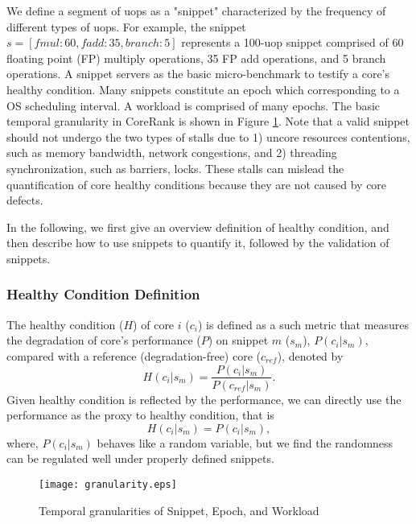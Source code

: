 We define a segment of uops as a "snippet" characterized by the frequency of different types of uops. For example, the snippet $s=[fmul:60, fadd:35, branch:5]$ represents a 100-uop snippet comprised of 60 floating point (FP) multiply operations, 35 FP add operations, and 5 branch operations. A snippet servers as the basic micro-benchmark to testify a core's healthy condition. Many snippets constitute an epoch which corresponding to a OS scheduling interval. A workload is comprised of many epochs. The basic temporal granularity in CoreRank is shown in Figure \ref{granu}. Note that a valid snippet should not undergo the two types of stalls due to 1) uncore resources contentions, such as memory bandwidth, network congestions, and 2) threading synchronization, such as barriers, locks. These stalls can mislead the quantification of core healthy conditions because they are not caused by core defects.

In the following,  we first give an overview definition of healthy condition, and then describe how to use snippets to quantify it, followed by the validation of snippets. 

\subsubsection{Healthy Condition Definition}
The healthy condition ($H$) of core $i$ ($c_i$) is defined as a such metric that measures the degradation of core's performance ($P$) on snippet $m$ ($s_m$), $P(c_i|s_m)$, compared with a reference (degradation-free) core ($c_{ref}$), denoted by
\begin{equation}
  H(c_i|s_m) = \frac{P(c_i|s_m)}{P(c_{ref}|s_m)}.\label{hdef}
\end{equation}
Given healthy condition is reflected by the performance, we can directly use the performance as the proxy to healthy condition, that is
\begin{equation}
  H({c_i|s_m}) = {P(c_i|s_m)}, \label{healthy}
\end{equation}
where, $P(c_i|s_m)$ behaves like a random variable, but we find the randomness can be regulated well under properly defined snippets.

\begin{figure}[t]
  \centering
  \texttt{[image: granularity.eps]}\\
  \caption{Temporal granularities of Snippet, Epoch, and Workload}\label{granu}
\end{figure}


